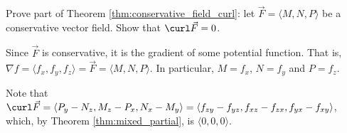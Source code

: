 {Prove part of Theorem \ref{thm:conservative_field_curl}: let $\vec F =\langle M,N,P\rangle$ be a conservative vector field. Show that $\curl \vec F = 0$. 
}
{Since $\vec F$ is conservative, it is the gradient of some potential function. That is, $\nabla f = \langle f_x,f_y,f_z\rangle = \vec F = \langle M, N, P\rangle$. In particular, $M = f_x$, $N = f_y$ and $P=f_z$.

Note that $\curl \vec F = \langle P_y - N_z, M_z-P_x, N_x-M_y \rangle = \langle f_{zy} - f_{yz}, f_{xz} - f_{zx}, f_{yx} - f_{xy}\rangle$, which, by Theorem \ref{thm:mixed_partial}, is $\langle 0,0,0\rangle$.
}
